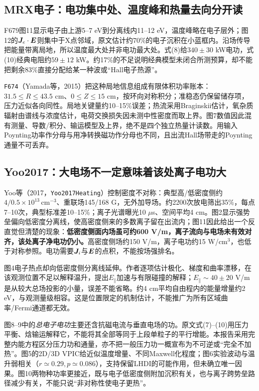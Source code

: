\subsection{MRX电子：电功集中处、温度峰和热量去向分开读}
F679图11显示电子由上游5--7 eV到分离线内11--12 eV，温度峰略在电子层外；图12的$\bm{J}_e\cdot\bm{E}$则集中于X点邻域，原文估计约70\%的电子沉积在小蓝框内。沿场传导把能量带离局地，所以温度最大处并非电功最大处。式(8)给$340\pm30$ kW电功，式(10)经典电阻约$59\pm12$ kW。约17\%的不足说明经典模型未闭合所测预算，却不能把剩余83\%直接分配给某一种波或“Hall电子热源”。\citep{F679}

\texttt{F674}（Yamada等，2015）把这种局地信息组成有限体积功率账本：$31.5\leq R\leq43.5$ cm、$0\leq Z\leq15$ cm，按环向对称积分；准稳态仍保留储存项，压力近似各向同性。局地关键量约10--15\%误差；热流采用Braginskii估计，氧杂质辐射由谱线与浓度估计，电荷交换损失因未测中性密度而取上界。图7数值因此混有测量、导数/积分、输运模型及上界，绝不是四个独立热量计读数。用输入Poynting功率作分母与用净转换磁功作分母也不同，且出流Hall场带走的Poynting通量不可丢弃。\citep{F674}

\subsection{Yoo2017：大电场不一定意味着该处离子电功大}
Yoo等（2017，\texttt{Yoo2017Heating}）控制密度不对称：典型高/低密度侧约$4/0.5\times10^{13}\,\mathrm{cm^{-3}}$、重联场145/168 G，无外加导场。约2200次放电筛出35\%，每点7--10次，典型标准差10--15\%；离子光谱曝光10 $\mu$s、空间平均4 cm。图2显示强势垒偏向低密度分离线，使高密度侧来的多数离子留在出流内；图11因此给出一个反直觉但清楚的现象：\textbf{低密度侧面内场虽可约600 V/m，离子流向与电场未有效对齐，该处离子净电功仍小。}高密度侧场约150 V/m，离子电功约15 W/cm$^3$，也低于对称参照。电功需要$\bm{J}_i$与$\bm{E}$的点积，不能按场强排名。\citep{Yoo2017Heating}

图4电子热点却向低密度侧分离线延伸。作者逐项估计极化、梯度和曲率漂移，在该观测位置不足以解释温升，提出$E_\parallel$加速与有限碰撞的解释；$E_\parallel\sim40\pm20$ V/m是从较大总场投影的小量，误差不能省略。约4 cm平均自由程内的能量增量约2 eV，与观测量级相容。这是位置限定的机制估计，不能推广为所有区域曲率/Fermi通道都无效。

图8--9中的\emph{总电子电功}主要还含抗磁电流与垂直电场的功。原文式(7)--(10)用压力平衡、焓输运解释它，不能将其全部等同于上段单粒子的平行增能。本报告采用完整内能方程区分压力功和通量，亦不把一般压力功一概宣布为不可逆或“完全不加热”。图5的2D/3D VPIC给近似温度增量、不同Maxwell化程度；图6实验波动与温升弱相关（$r\simeq0.29,p\simeq0.086$），支持保留LHDI的可能作用，但未确立唯一因果。图10两物种功率更接近，既与电子低密度侧附加沉积有关，也与离子跨势垒路径减少有关，不能只说“非对称性使电子更热”。

